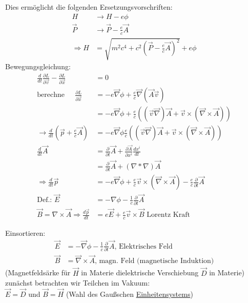 \documentclass[a4paper]{article}
\begin{document}
Dies ermöglicht die folgenden Ersetzungsvorschriften:
\begin{align}
H &\rightarrow H-e\phi\\
\vec{P} &\rightarrow \vec{P}-\frac{e}{c}\vec{A}\\
\Rightarrow H&=\sqrt{m^2c^4+c^2\left(\vec{P}-\frac{e}{c}\vec{A}\right)^2}+e\phi
\end{align}
Bewegungsgleichung:
\begin{align}
\frac{d}{dt}\frac{\partial L}{\partial \vec{v}}-\frac{\partial L}{\partial
\vec{x}}&=0\\
\text{berechne }\ \ \ \ \  \frac{\partial
L}{\partial\vec{x}}&=-e\vec{\nabla}\phi+ \frac{e}{c}\vec{\nabla}(\vec{A}\vec{v})\\
&=-e\vec{\nabla}\phi+\frac{e}{c}\left(
(\vec{v}\vec{\nabla})\vec{A}+\vec{v}\times(\vec{\nabla}\times\vec{A}) \right)\\
\rightarrow \frac{d}{dt}(\vec{p}+\frac{e}{c}\vec{A})&=-e\vec{\nabla}\phi
\frac{e}{c}\left( (\vec{v}\vec{\nabla})\vec{A}+\vec{v}\times(\vec{\nabla}\times\vec{A})
\right)\\
\frac{d}{dt}\vec{A}&=\frac{\partial}{\partial t}\vec{A}+
\frac{\partial\vec{A}}{\partial x^i}\frac{dx^i}{dt}\\
&=\frac{\partial}{\partial t}\vec{A}+(\nabla*\nabla)\vec{A}\\
\Rightarrow
\frac{d}{dt}\vec{p}&=-e\vec{\nabla}\phi+\frac{e}{c}\vec{v}
\times(\vec{\nabla}\times\vec{A}) -\frac{e}{c}\frac{\partial}{\partial t}\vec{A}\\
\text{Def.: }\vec{E}&=-\nabla\phi-\frac{1}{c}\frac{\partial}{\partial
t}\vec{A}\\
\vec{B}=\nabla \times \vec{A}
\Rightarrow \frac{d\vec{p}}{dt}&=e\vec{E}+\frac{e}{c}\vec{v}\times\vec{B} 
\text{ Lorentz Kraft}
\end{align}

Einsortieren:
\begin{align}
\vec{E}&=-\vec{\nabla}\phi-\frac{1}{c}\frac{\partial}{\partial t}\vec{A}
\text{, Elektrisches Feld}\\
\vec{B}&=\vec{\nabla}\times\vec{A} \text{, magn. Feld (magnetische Induktion)}
\end{align}
(Magnetfeldsärke für $\vec{H}$ in Materie dielektrische Verschiebung $\vec{D}$
in Materie)\\
zunächst betrachten wir Teilchen im Vakuum:\\
$\vec{E}=\vec{D}$ und $\vec{B}=\vec{H}$ (Wahl des Gaußschen
\underline{Einheitensystems})
\end{document}
